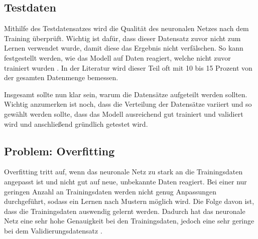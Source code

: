 \subsection{Testdaten}
Mithilfe des Testdatensatzes wird die Qualität des neuronalen Netzes nach dem Training überprüft. Wichtig ist dafür, dass dieser Datensatz zuvor nicht zum Lernen verwendet wurde, 
damit diese das Ergebnis nicht verfälschen.
So kann festgestellt werden, wie das Modell auf Daten reagiert, welche nicht zuvor trainiert wurden \cite[Seite 80f]{CA18}.
In der Literatur wird dieser Teil oft mit 10 bis 15 Prozent von der gesamten Datenmenge bemessen.

\noindent
Insgesamt sollte nun klar sein, warum die Datensätze aufgeteilt werden sollten. 
Wichtig anzumerken ist noch, dass die Verteilung der Datensätze variiert und so gewählt werden sollte, dass das Modell ausreichend gut trainiert und validiert wird und anschließend gründlich getestet wird.

\subsection{Problem: Overfitting}
Overfitting tritt auf, wenn das neuronale Netz zu stark an die Trainingsdaten angepasst ist und nicht gut auf neue, unbekannte Daten reagiert. 
Bei einer nur geringen Anzahl an Trainingsdaten werden nicht genug Anpassungen durchgeführt, sodass ein Lernen nach Mustern möglich wird. Die Folge davon ist, dass die Trainingsdaten auswendig gelernt werden.
Dadurch hat das neuronale Netz eine sehr hohe Genauigkeit bei den Trainingsdaten, jedoch eine sehr geringe bei dem Validierungsdatensatz \cite[Seite 25]{CA18}. 